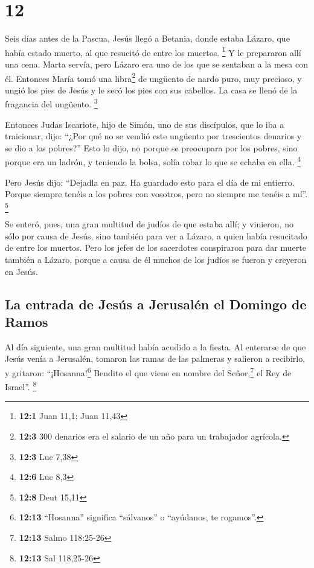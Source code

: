 \hypertarget{section-11}{%
\section{12}\label{section-11}}

 Seis días antes de la Pascua, Jesús llegó a Betania,
donde estaba Lázaro, que había estado muerto, al que resucitó de entre
los muertos. \footnote{\textbf{12:1} Juan 11,1; Juan 11,43}
 Y le prepararon allí una cena. Marta servía, pero Lázaro
era uno de los que se sentaban a la mesa con él.  Entonces
María tomó una libra\footnote{\textbf{12:3} 300 denarios era el salario
  de un año para un trabajador agrícola.} de ungüento de nardo puro, muy
precioso, y ungió los pies de Jesús y le secó los pies con sus cabellos.
La casa se llenó de la fragancia del ungüento. \footnote{\textbf{12:3}
  Luc 7,38}

 Entonces Judas Iscariote, hijo de Simón, uno de sus
discípulos, que lo iba a traicionar, dijo:  ``¿Por qué no
se vendió este ungüento por trescientos denarios y se dio a los
pobres?''  Esto lo dijo, no porque se preocupara por los
pobres, sino porque era un ladrón, y teniendo la bolsa, solía robar lo
que se echaba en ella. \footnote{\textbf{12:6} Luc 8,3}

 Pero Jesús dijo: ``Dejadla en paz. Ha guardado esto para
el día de mi entierro.  Porque siempre tenéis a los pobres
con vosotros, pero no siempre me tenéis a mí''. \footnote{\textbf{12:8}
  Deut 15,11}

 Se enteró, pues, una gran multitud de judíos de que
estaba allí; y vinieron, no sólo por causa de Jesús, sino también para
ver a Lázaro, a quien había resucitado de entre los muertos.
 Pero los jefes de los sacerdotes conspiraron para dar
muerte también a Lázaro,  porque a causa de él muchos de
los judíos se fueron y creyeron en Jesús.

\hypertarget{la-entrada-de-jesuxfas-a-jerusaluxe9n-el-domingo-de-ramos}{%
\subsection{La entrada de Jesús a Jerusalén el Domingo de
Ramos}\label{la-entrada-de-jesuxfas-a-jerusaluxe9n-el-domingo-de-ramos}}

 Al día siguiente, una gran multitud había acudido a la
fiesta. Al enterarse de que Jesús venía a Jerusalén, 
tomaron las ramas de las palmeras y salieron a recibirlo, y gritaron:
``¡Hosanna!\footnote{\textbf{12:13} ``Hosanna'' significa ``sálvanos'' o
  ``ayúdanos, te rogamos''.} Bendito el que viene en nombre del
Señor,\footnote{\textbf{12:13} Salmo 118:25-26} el Rey de Israel''.
\footnote{\textbf{12:13} Sal 118,25-26}

